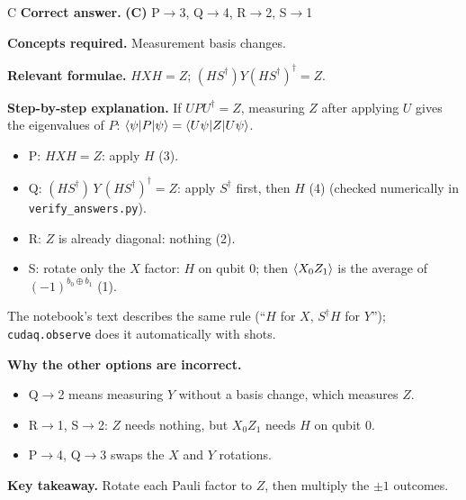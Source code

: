 \documentclass[11pt,a4paper]{article}
\newcommand{\qsep}{\par\vspace{2pt}{\color{black!15}\hrule}\vspace{4pt}}
\begin{document}
\begin{solbox}{C}
\textbf{\color{brand}Correct answer.} \textcolor{okgreen}{\textbf{(C)}} P$\to$3, Q$\to$4, R$\to$2, S$\to$1

\textbf{\color{brand}Concepts required.} Measurement basis changes.

\textbf{\color{brand}Relevant formulae.} $HXH = Z$; $(HS^\dagger)Y(HS^\dagger)^\dagger = Z$.

\textbf{\color{brand}Step-by-step explanation.} If $UPU^\dagger = Z$, measuring $Z$ after applying $U$ gives the eigenvalues of $P$: $\braket{\psi|P|\psi} = \braket{U\psi|Z|U\psi}$.
\begin{itemize}\itemsep0pt
\item P: $HXH = Z$: apply $H$ (3).
\item Q: $(HS^\dagger)\,Y\,(HS^\dagger)^\dagger = Z$: apply $S^\dagger$ first, then $H$ (4) (checked numerically in \texttt{verify\_answers.py}).
\item R: $Z$ is already diagonal: nothing (2).
\item S: rotate only the $X$ factor: $H$ on qubit 0; then $\braket{X_0Z_1}$ is the average of $(-1)^{b_0\oplus b_1}$ (1).
\end{itemize}
The notebook's text describes the same rule (``$H$ for $X$, $S^\dagger H$ for $Y$''); \texttt{cudaq.observe} does it automatically with shots.

\textbf{\color{brand}Why the other options are incorrect.}
\begin{itemize}[leftmargin=2.4em, itemsep=1pt, topsep=2pt]
\item[\textbf{(A)}] Q$\to$2 means measuring $Y$ without a basis change, which measures $Z$.
\item[\textbf{(B)}] R$\to$1, S$\to$2: $Z$ needs nothing, but $X_0Z_1$ needs $H$ on qubit 0.
\item[\textbf{(D)}] P$\to$4, Q$\to$3 swaps the $X$ and $Y$ rotations.
\end{itemize}
\textbf{\color{brand}Key takeaway.} Rotate each Pauli factor to $Z$, then multiply the $\pm1$ outcomes.
\end{solbox}
\qsep
\end{document}

